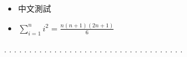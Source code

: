 \begin{itemize}
\item 中文測試 
\item $\sum \limits_{i=1}^n i^2 = \frac{n(n+1)(2n+1)}{6}$
\end{itemize}
.
.
.
.
.
.
.
.
.
.
.
.
.
.
.
.
.
.
.
.
.
.
.
.
.
.
.
.
.
.
.
.
.
.
.
.
